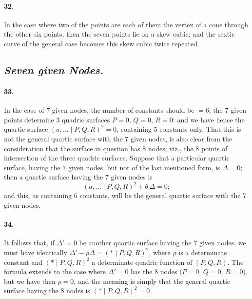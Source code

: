 \documentclass[11pt,a4paper]{article}
\begin{document}
\paragraph{32.}
In the case where two of the points are each of them the vertex of a cone through the
other six points, then the seven points lie on a skew cubic; and the sextic curve of the
general case becomes this skew cubic twice repeated.

\subsection*{\textit{Seven given Nodes.}}

\paragraph{33.}
In the case of $7$ given nodes, the number of constants should be $= 6$; the $7$ given
points determine $3$ quadric surfaces $P = 0$, $Q = 0$, $R = 0$: and we have hence the
quartic surface $(a, \ldots  \mid P, Q, R)^2 = 0$, containing $5$ constants only. That
this is not the general quartic surface with the $7$ given nodes, is also clear from the
consideration that the surface in question has $8$ nodes; viz., the $8$ points of
intersection of the three quadric surfaces. Suppose that a particular quartic surface,
having the $7$ given nodes, but not of the last mentioned form, is $\Delta = 0$; then a
quartic surface having the $7$ given nodes is
\[
(a, \ldots  \mid P, Q, R)^2 + \theta\,\Delta = 0;
\]
and this, as containing $6$ constants, will be the general quartic surface with the $7$
given nodes.

\paragraph{34.}
It follows that, if $\Delta' = 0$ be another quartic surface having the $7$ given nodes,
we must have identically $\Delta' - \rho \Delta = (* \mid P, Q, R)^2$, where $\rho$ is
a determinate constant and $(* \mid P, Q, R)^2$ a determinate quadric function of
$(P, Q, R)$. The formula extends to the case where $\Delta' = 0$ has the $8$ nodes
$(P = 0$, $Q = 0$, $R = 0)$, but we have then $\rho = 0$, and the meaning is simply that
the general quartic surface having the $8$ nodes is $(* \mid P, Q, R)^2 = 0$.
\end{document}
